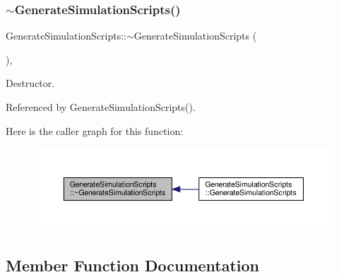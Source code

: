 \subsubsection{\texorpdfstring{$\sim$\+Generate\+Simulation\+Scripts()}{~GenerateSimulationScripts()}}
{\footnotesize\ttfamily Generate\+Simulation\+Scripts\+::$\sim$\+Generate\+Simulation\+Scripts (\begin{DoxyParamCaption}{ }\end{DoxyParamCaption})\hspace{0.3cm}{\ttfamily [override]}, {\ttfamily [default]}}



Destructor. 



Referenced by Generate\+Simulation\+Scripts().

Here is the caller graph for this function\+:
\nopagebreak
\begin{figure}[H]
\begin{center}
\leavevmode
\includegraphics[width=350pt]{d4/d1b/classGenerateSimulationScripts_a381cd9df3c89a17d96b29d7f0c347411_icgraph}
\end{center}
\end{figure}


\subsection{Member Function Documentation}
\mbox{\label{classGenerateSimulationScripts_ac858ec8a3c5b84ecdc5e0f65be2774d6}} 
